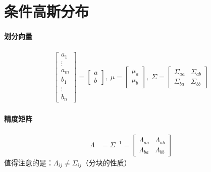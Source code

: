 \documentclass[cn,black,12pt,normal]{elegantnote}
\begin{document}
\section{条件高斯分布}

\paragraph{划分向量}
\begin{align*}
    \begin{bmatrix}
        a_1    \\
        \vdots \\
        a_m    \\
        b_1    \\
        \vdots \\
        b_n
    \end{bmatrix} = \begin{bmatrix}
                          a \\
                          b
                      \end{bmatrix},\; \mu = \begin{bmatrix}
                                                  \mu_a \\
                                                  \mu_b
                                              \end{bmatrix},\; \Sigma = \begin{bmatrix}
                                                                             \Sigma_{aa} & \Sigma_{ab} \\
                                                                             \Sigma_{ba} & \Sigma_{bb}
                                                                         \end{bmatrix}
\end{align*}

\paragraph{精度矩阵}
\begin{align*}
    \Lambda & = \Sigma^{-1} = \begin{bmatrix}
                                  \Lambda_{aa} & \Lambda_{ab} \\
                                  \Lambda_{ba} & \Lambda_{bb}
                              \end{bmatrix}
\end{align*}
值得注意的是：$\Lambda_{ij}\neq\Sigma_{ij}$（分块的性质）
\end{document}
